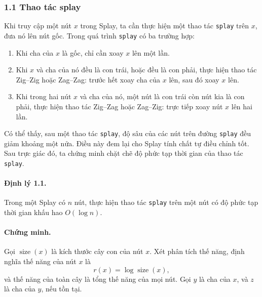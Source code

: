 \documentclass[11pt]{article}
\begin{document}
\subsubsection*{1.1 Thao tác splay}

Khi truy cập một nút \(x\) trong Splay, ta cần thực hiện một thao tác
\texttt{splay} trên \(x\), đưa nó lên nút gốc. Trong quá trình \texttt{splay}
có ba trường hợp:

\begin{enumerate}
  \item Khi cha của \(x\) là gốc, chỉ cần xoay \(x\) lên một lần.
  \item Khi \(x\) và cha của nó đều là con trái, hoặc đều là con phải, thực
  hiện thao tác Zig--Zig hoặc Zag--Zag: trước hết xoay cha của \(x\) lên, sau
  đó xoay \(x\) lên.
  \item Khi trong hai nút \(x\) và cha của nó, một nút là con trái còn nút kia
  là con phải, thực hiện thao tác Zig--Zag hoặc Zag--Zig: trực tiếp xoay nút
  \(x\) lên hai lần.
\end{enumerate}

Có thể thấy, sau một thao tác \texttt{splay}, độ sâu của các nút trên đường
\texttt{splay} đều giảm khoảng một nửa. Điều này đem lại cho Splay tính chất tự
điều chỉnh tốt. Sau trực giác đó, ta chứng minh chặt chẽ độ phức tạp thời gian
của thao tác \texttt{splay}.

\paragraph{Định lý 1.1.}
Trong một Splay có \(n\) nút, thực hiện thao tác \texttt{splay} trên một nút có
độ phức tạp thời gian khấu hao \(O(\log n)\).

\paragraph{Chứng minh.}
Gọi \(\operatorname{size}(x)\) là kích thước cây con của nút \(x\). Xét phân
tích thế năng, định nghĩa thế năng của nút \(x\) là
\[
  r(x)=\log \operatorname{size}(x),
\]
và thế năng của toàn cây là tổng thế năng của mọi nút. Gọi \(y\) là cha của
\(x\), và \(z\) là cha của \(y\), nếu tồn tại.
\end{document}
